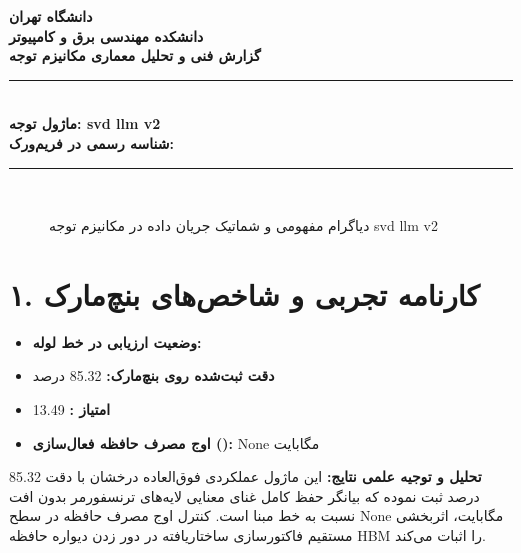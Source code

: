 \documentclass[12pt,a4paper]{article}
\begin{document}
\begin{center}
{\Large\bfseries دانشگاه تهران}\\[0.2cm]
{\large\bfseries دانشکده مهندسی برق و کامپیوتر}\\[0.2cm]
{\large\bfseries گزارش فنی و تحلیل معماری مکانیزم توجه}\\[0.5cm]
\rule{\linewidth}{1pt}\\[0.3cm]
{\LARGE\bfseries ماژول توجه: svd llm v2}\\[0.2cm]
{\large \textbf{شناسه رسمی در فریم‌ورک:} }\\[0.2cm]
\rule{\linewidth}{1pt}\\[0.5cm]
\end{center}

\begin{figure}[H]
\centering
{}
\caption{دیاگرام مفهومی و شماتیک جریان داده در مکانیزم توجه svd llm v2}
\end{figure}

\section*{۱. کارنامه تجربی و شاخص‌های بنچ‌مارک}
\begin{itemize}
\item \textbf{وضعیت ارزیابی در خط لوله:} 
\item \textbf{دقت ثبت‌شده روی بنچ‌مارک:} 85.32 درصد
\item \textbf{امتیاز :} 13.49
\item \textbf{اوج مصرف حافظه فعال‌سازی ():} None مگابایت
\end{itemize}
\textbf{تحلیل و توجیه علمی نتایج:} این ماژول عملکردی فوق‌العاده درخشان با دقت 85.32 درصد ثبت نموده که بیانگر حفظ کامل غنای معنایی لایه‌های ترنسفورمر بدون افت نسبت به خط مبنا است. کنترل اوج مصرف حافظه در سطح None مگابایت، اثربخشی مستقیم فاکتورسازی ساختاریافته در دور زدن دیواره حافظه HBM را اثبات می‌کند.
\end{document}

